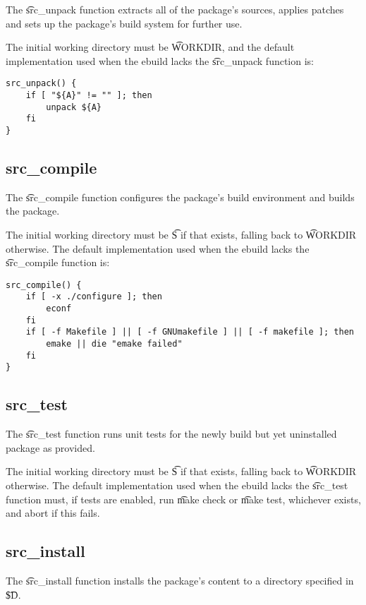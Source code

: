 The \t{src\_unpack} function extracts all of the package's sources, applies patches and sets up the
package's build system for further use.

The initial working directory must be \t{WORKDIR}, and the default implementation used when
the ebuild lacks the \t{src\_unpack} function is:

\begin{lstlisting}
src_unpack() {
    if [ "${A}" != "" ]; then
        unpack ${A}
    fi
}
\end{lstlisting}

\subsection{src\_compile}
\label{src-compile-function}

The \t{src\_compile} function configures the package's build environment and builds the package.

The initial working directory must be \t{S} if that exists, falling back to \t{WORKDIR} otherwise.
The default implementation used when the ebuild lacks the \t{src\_compile} function is:

\begin{lstlisting}
src_compile() {
    if [ -x ./configure ]; then
        econf
    fi
    if [ -f Makefile ] || [ -f GNUmakefile ] || [ -f makefile ]; then
        emake || die "emake failed"
    fi
}
\end{lstlisting}

\subsection{src\_test}
\label{src-test-function}

The \t{src\_test} function runs unit tests for the newly build but yet uninstalled package as
provided.

The initial working directory must be \t{S} if that exists, falling back to \t{WORKDIR} otherwise.
The default implementation used when the ebuild lacks the \t{src\_test} function must, if tests are
enabled, run \t{make check} or \t{make test}, whichever exists, and abort if this fails.

\subsection{src\_install}
\label{src-install-function}

The \t{src\_install} function installs the package's content to a directory specified in
\t{\${D}}.

